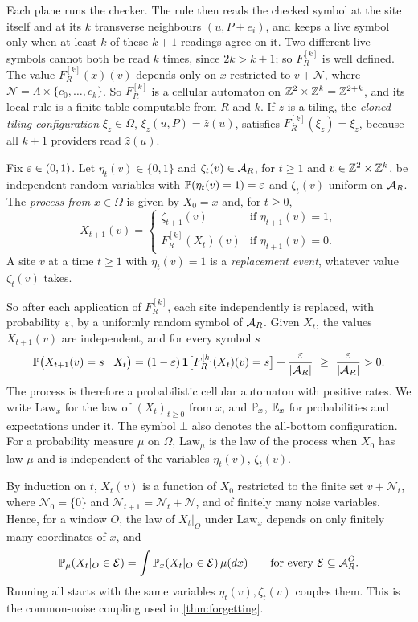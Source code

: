 Each plane runs the checker. The rule then reads the checked symbol at the site itself and at its $k$ transverse neighbours $(u,P+e_i)$, and keeps a live symbol only when at least $k$ of these $k+1$ readings agree on it. Two different live symbols cannot both be read $k$ times, since $2k>k+1$; so $F^{[k]}_R$ is well defined. The value $F^{[k]}_R(x)(v)$ depends only on $x$ restricted to $v+\mathcal N$, where $\mathcal N=\Lambda\times\{c_0,\dots,c_k\}$. So $F^{[k]}_R$ is a cellular automaton on $\mathbb{Z}^2\times\mathbb{Z}^k=\mathbb{Z}^{2+k}$, and its local rule is a finite table computable from $R$ and $k$. If $z$ is a tiling, the \emph{cloned tiling configuration} $\xi_z\in\Omega$, $\xi_z(u,P)=\hat z(u)$, satisfies $F^{[k]}_R(\xi_z)=\xi_z$, because all $k+1$ providers read $\hat z(u)$.

\begin{definition}\label{set:def-noise}
Fix $\varepsilon\in(0,1)$. Let $\eta_t(v)\in\{0,1\}$ and $\zeta_t(v)\in\mathcal{A}_R$, for $t\ge1$ and $v\in\mathbb{Z}^2\times\mathbb{Z}^k$, be independent random variables with $\mathbb{P}(\eta_t(v)=1)=\varepsilon$ and $\zeta_t(v)$ uniform on $\mathcal{A}_R$. The \emph{process from} $x\in\Omega$ is given by $X_0=x$ and, for $t\ge0$,
\[
X_{t+1}(v)=
\begin{cases}
\zeta_{t+1}(v) & \text{if } \eta_{t+1}(v)=1,\\
F^{[k]}_R(X_t)(v) & \text{if } \eta_{t+1}(v)=0.
\end{cases}
\]
A site $v$ at a time $t\ge1$ with $\eta_t(v)=1$ is a \emph{replacement event}, whatever value $\zeta_t(v)$ takes.
\end{definition}

So after each application of $F^{[k]}_R$, each site independently is replaced, with probability $\varepsilon$, by a uniformly random symbol of $\mathcal{A}_R$. Given $X_t$, the values $X_{t+1}(v)$ are independent, and for every symbol $s$
\[
\Prob\bigl(X_{t+1}(v)=s\mid X_t\bigr)=(1-\eps)\,\mathbf 1\bigl[F^{[k]}_R(X_t)(v)=s\bigr]+\frac{\eps}{|\A_R|}\ \ge\ \frac{\eps}{|\A_R|}>0 .
\]
The process is therefore a probabilistic cellular automaton with positive rates. We write $\mathrm{Law}_x$ for the law of $(X_t)_{t\ge0}$ from $x$, and $\mathbb{P}_x$, $\mathbb{E}_x$ for probabilities and expectations under it. The symbol $\bot$ also denotes the all-bottom configuration. For a probability measure $\mu$ on $\Omega$, $\mathrm{Law}_\mu$ is the law of the process when $X_0$ has law $\mu$ and is independent of the variables $\eta_t(v)$, $\zeta_t(v)$.

By induction on $t$, $X_t(v)$ is a function of $X_0$ restricted to the finite set $v+\mathcal N_t$, where $\mathcal N_0=\{0\}$ and $\mathcal N_{t+1}=\mathcal N_t+\mathcal N$, and of finitely many noise variables. Hence, for a window $O$, the law of $X_t|_O$ under $\mathrm{Law}_x$ depends on only finitely many coordinates of $x$, and
\[
\mathbb{P}_\mu(X_t|_O\in\mathcal E)=\int\mathbb{P}_x(X_t|_O\in\mathcal E)\,\mu(dx)\qquad\text{for every }\mathcal E\subseteq\mathcal{A}_R^O .
\]
Running all starts with the same variables $\eta_t(v),\zeta_t(v)$ couples them. This is the common-noise coupling used in \cref{thm:forgetting}.

